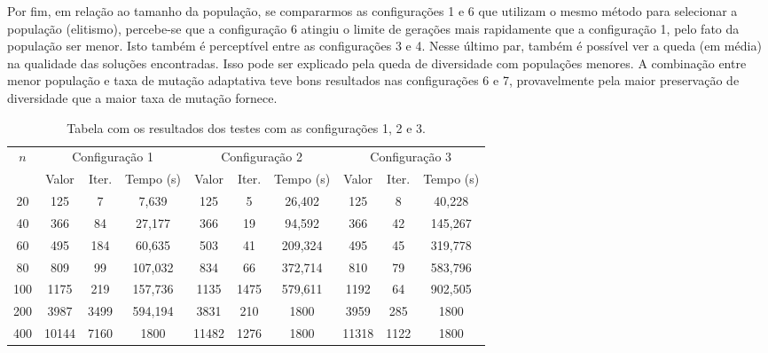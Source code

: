 \documentclass{MO824}
\begin{document}
Por fim, em relação ao tamanho da população, se compararmos as configurações 1 e 6 que utilizam o mesmo método para selecionar a população (elitismo), percebe-se que a configuração 6 atingiu o limite de gerações mais rapidamente que a configuração 1, pelo fato da população ser menor. Isto também é perceptível entre as configurações 3 e 4. Nesse último par, também é possível ver a queda (em média) na qualidade das soluções encontradas. Isso pode ser explicado pela queda de diversidade com populações menores. A combinação entre menor população e taxa de mutação adaptativa teve bons resultados nas configurações 6 e 7, provavelmente pela maior preservação de diversidade que a maior taxa de mutação fornece. 

\begin{table}[H]
    \centering
     \caption{Tabela com os resultados dos testes com as configurações 1, 2 e 3.}
     \vspace{0.3cm}
      \begin{adjustbox}{max width=\textwidth}
    \begin{tabular}{|c|c|c|c|c|c|c|c|c|c|}
 \hline
 \multicolumn{1}{|c|}{\multirow{2}{*}{$n$}}  & \multicolumn{3}{c|}{Configuração 1}  & \multicolumn{3}{c|}{Configuração 2}  & \multicolumn{3}{c|}{Configuração 3}    \\ \cline{2-10} 
 \multicolumn{1}{|c|}{} & \multicolumn{1}{c|}{Valor} & \multicolumn{1}{c|}{Iter.} & \multicolumn{1}{c|}{Tempo (s)} & \multicolumn{1}{c|}{Valor} & \multicolumn{1}{c|}{Iter.} & \multicolumn{1}{c|}{Tempo (s)} & \multicolumn{1}{c|}{Valor} & \multicolumn{1}{c|}{Iter.} & \multicolumn{1}{c|}{Tempo (s)} \\ \hline
 20 & 125 & 7 & 7,639 & 125 & 5 & 26,402 & 125 & 8 & 40,228\\ \hline
 40 & 366 & 84 & 27,177 & 366 & 19 & 94,592 & 366 & 42 & 145,267\\ \hline
 60 & 495 & 184 & 60,635 & 503 & 41 & 209,324 & 495 & 45 & 319,778\\ \hline
 80 & 809 & 99 & 107,032 & 834 & 66 & 372,714 & 810 & 79 & 583,796\\ \hline
 100 & 1175 & 219 & 157,736 & 1135 & 1475 & 579,611 & 1192 & 64 & 902,505\\ \hline
 200 & 3987 & 3499 & 594,194 & 3831 & 210 & 1800 & 3959 & 285 & 1800\\ \hline
 400 & 10144 & 7160 & 1800 & 11482 & 1276 & 1800 & 11318 & 1122 & 1800\\ \hline
    \end{tabular}
    \end{adjustbox}
    \label{tab:conf123}
\end{table}
\end{document}
